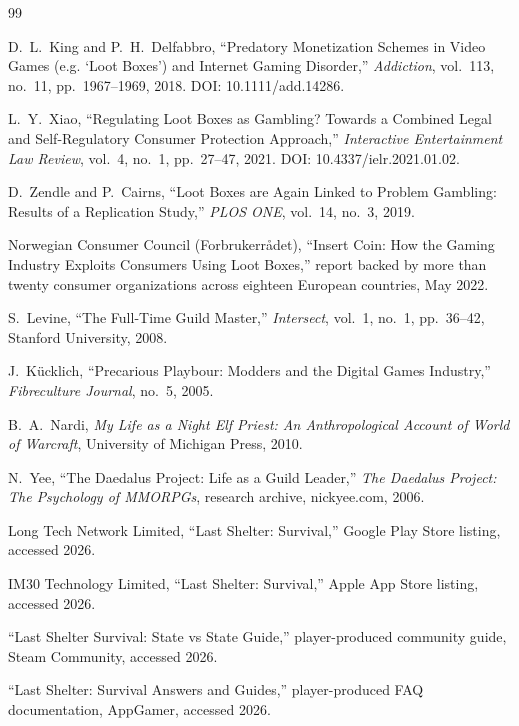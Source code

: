\documentclass[11pt]{article}
\begin{document}
\begin{thebibliography}{99}

D.~L.~King and P.~H.~Delfabbro, ``Predatory Monetization Schemes in Video Games (e.g. `Loot Boxes') and Internet Gaming Disorder,'' \emph{Addiction}, vol.~113, no.~11, pp.~1967--1969, 2018. DOI: 10.1111/add.14286.

L.~Y.~Xiao, ``Regulating Loot Boxes as Gambling? Towards a Combined Legal and Self-Regulatory Consumer Protection Approach,'' \emph{Interactive Entertainment Law Review}, vol.~4, no.~1, pp.~27--47, 2021. DOI: 10.4337/ielr.2021.01.02.

D.~Zendle and P.~Cairns, ``Loot Boxes are Again Linked to Problem Gambling: Results of a Replication Study,'' \emph{PLOS ONE}, vol.~14, no.~3, 2019.

Norwegian Consumer Council (Forbrukerr\aa det), ``Insert Coin: How the Gaming Industry Exploits Consumers Using Loot Boxes,'' report backed by more than twenty consumer organizations across eighteen European countries, May 2022.

S.~Levine, ``The Full-Time Guild Master,'' \emph{Intersect}, vol.~1, no.~1, pp.~36--42, Stanford University, 2008.

J.~K\"ucklich, ``Precarious Playbour: Modders and the Digital Games Industry,'' \emph{Fibreculture Journal}, no.~5, 2005.

B.~A.~Nardi, \emph{My Life as a Night Elf Priest: An Anthropological Account of World of Warcraft}, University of Michigan Press, 2010.

N.~Yee, ``The Daedalus Project: Life as a Guild Leader,'' \emph{The Daedalus Project: The Psychology of MMORPGs}, research archive, nickyee.com, 2006.

Long Tech Network Limited, ``Last Shelter: Survival,'' Google Play Store listing, accessed 2026.

IM30 Technology Limited, ``Last Shelter: Survival,'' Apple App Store listing, accessed 2026.

``Last Shelter Survival: State vs State Guide,'' player-produced community guide, Steam Community, accessed 2026.

``Last Shelter: Survival Answers and Guides,'' player-produced FAQ documentation, AppGamer, accessed 2026.

\end{thebibliography}
\end{document}
